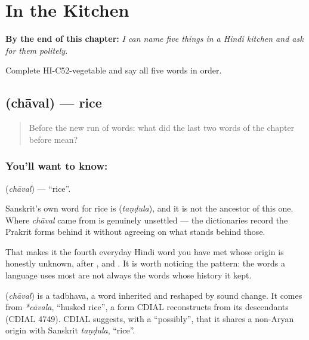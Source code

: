 
\chapter{In the Kitchen}
\label{ch:hi-in-the-kitchen}

\begin{chapteropening}
\textbf{By the end of this chapter:} \emph{I can name five things in a Hindi kitchen and ask for them politely.}

Complete HI-C52-vegetable and say all five words in order.
\end{chapteropening}

\section[\texorpdfstring{\hi{चावल} (chāval)}{चावल (chāval)}]{ (chāval) — rice}

\label{lesson:HI-C52-rice}



\begin{quote}
Before the new run of words: what did the last two words of the chapter before mean?
\end{quote}

\subsection*{You'll want to know: }
\textbf{} (\emph{chāval}) — \textquotedblleft{}rice\textquotedblright{}.

Sanskrit's own word for rice is  (\emph{taṇḍula}), and it is not the ancestor of this one. Where \emph{chāval} came from is genuinely unsettled — the dictionaries record the Prakrit forms behind it without agreeing on what stands behind those.

That makes it the fourth everyday Hindi word you have met whose origin is honestly unknown, after ,  and . It is worth noticing the pattern: the words a language uses most are not always the words whose history it kept.

\begin{cousinweb}
\textbf{} (\emph{chāval}) is a tadbhava, a word inherited and reshaped by sound change. It comes from \emph{*cāvala}, \textquotedblleft{}husked rice\textquotedblright{}, a form CDIAL reconstructs from its descendants (CDIAL 4749). CDIAL suggests, with a \textquotedblleft{}possibly\textquotedblright{}, that it shares a non-Aryan origin with Sanskrit \emph{taṇḍula}, \textquotedblleft{}rice\textquotedblright{}.
\end{cousinweb}

